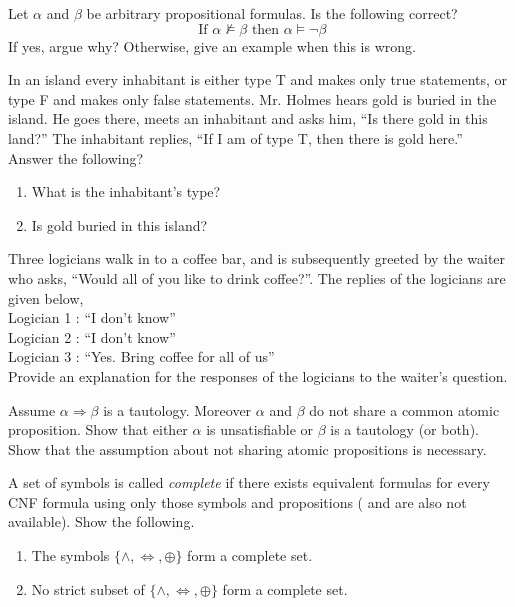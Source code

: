 \begin{exercise}
Let $\alpha$ and $\beta$ be arbitrary propositional formulas. 
Is the following correct? 
\[
\mbox{ If } \alpha \not \models \beta \mbox{ then } \alpha \models \neg \beta
\]
If yes, argue why? Otherwise, give an example when this is wrong.
\end{exercise}

\begin{exercise}
In an island every inhabitant is either type T and makes only true statements, or type F and makes only false statements. Mr. Holmes hears gold is buried in the island. He goes there, meets an inhabitant and asks him, “Is there gold in this land?” The inhabitant replies, “If I am of type T, then there is gold here.” Answer the following?
\begin{enumerate}[label=(\alph*)]
\item What is the inhabitant’s type? 
\item Is gold buried in this island?
\end{enumerate}
\end{exercise}

\begin{exercise} Three logicians walk in to a coffee bar, and is subsequently greeted by the waiter who asks, “Would all of you like to drink coffee?”. The replies of the logicians are given below, \\
Logician 1 : “I don’t know” \\
Logician 2 : “I don’t know” \\
Logician 3 : “Yes. Bring coffee for all of us” \\
Provide an explanation for the responses of the logicians to the waiter’s question.
\end{exercise}

\begin{exercise}
Assume $\alpha \Rightarrow \beta$ is a tautology. Moreover $\alpha$ and $\beta$ do not share a common atomic proposition. Show that either $\alpha$ is unsatisfiable or $\beta$ is a tautology (or both). Show that the assumption about not sharing atomic propositions is necessary.
\end{exercise}

\begin{exercise}
A set of symbols is called \emph{complete} if there exists equivalent formulas for every CNF formula using only those symbols and propositions (\true\/ and \false\/ are also not available). Show the following.
\begin{enumerate}
\item The symbols $\{\wedge, \Leftrightarrow, \oplus\}$ form a complete set.
\item No strict subset of $\{\wedge, \Leftrightarrow,\oplus\}$ form a complete set.
\end{enumerate}
\end{exercise}

